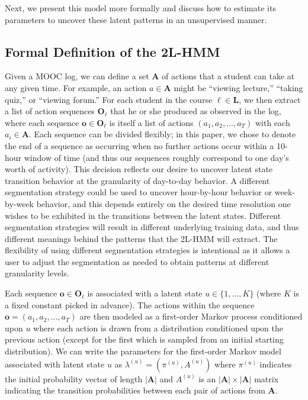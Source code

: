 Next, we present this model more formally and discuss how to
estimate its parameters to uncover these latent patterns in an unsupervised
manner.

\subsection{Formal Definition of the 2L-HMM}

Given a MOOC log, we can define a set $\mathbf{A}$ of actions that a
student can take at any given time. For example, an action $a \in
\mathbf{A}$ might be ``viewing lecture,'' ``taking quiz,'' or ``viewing
forum.'' For each student in the course $\ell \in \mathbf{L}$, we then
extract a list of action sequences $\mathbf{O}_\ell$ that he or she
produced as observed in the log, where each sequence $\mathbf{o} \in
\mathbf{O}_\ell$ is itself a list of actions $(a_1, a_2, \ldots, a_T)$ with
each $a_i \in \mathbf{A}$.  Each sequence can be divided flexibly; in this
paper, we chose to denote the end of a sequence as occurring when no further
actions occur within a 10-hour window of time (and thus our sequences
roughly correspond to one day's worth of activity). This decision reflects
our desire to uncover latent state transition behavior at the granularity
of day-to-day behavior. A different segmentation strategy could be used to
uncover hour-by-hour behavior or week-by-week behavior, and this depends
entirely on the desired time resolution one wishes to be exhibited in the
transitions between the latent states. Different segmentation strategies
will result in different underlying training data, and thus different
meanings behind the patterns that the 2L-HMM will extract. The flexibility
of using different segmentation strategies is intentional as it allows a
user to adjust the segmentation as needed to obtain patterns at different
granularity levels.

Each sequence $\mathbf{o} \in \mathbf{O}_\ell$ is associated with a latent
state $u \in \{1,\ldots,K\}$ (where $K$ is a fixed constant picked in
advance). The actions within the sequence $\mathbf{o} = (a_1, a_2, \ldots,
a_T)$ are then modeled as a first-order Markov process conditioned upon $u$
where each action is drawn from a distribution conditioned upon the
previous action (except for the first which is sampled from an initial
starting distribution). We can write the parameters for the first-order
Markov model associated with latent state $u$ as $\lambda^{(u)} =
(\pi^{(u)}, A^{(u)})$ where $\pi^{(u)}$ indicates the initial probability
vector of length $|\mathbf{A}|$ and $A^{(u)}$ is an $|\mathbf{A}| \times
|\mathbf{A}|$ matrix indicating the transition probabilities between each
pair of actions from $\mathbf{A}$.

